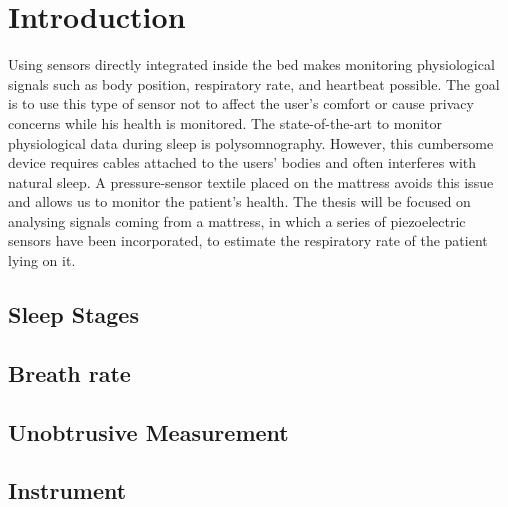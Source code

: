\chapter{Introduction}
Using sensors directly integrated inside the bed makes monitoring physiological signals such as body position, respiratory rate, and heartbeat possible. The goal is to use this type of sensor not to affect the user’s comfort or cause privacy concerns while his health is monitored. The state-of-the-art to monitor physiological data during sleep is polysomnography. 
However, this cumbersome device requires cables attached to the users' bodies and often interferes with natural sleep. A pressure-sensor textile placed on the mattress avoids this issue and allows us to monitor the patient's health. 
The thesis will be focused on analysing signals coming from a mattress, in which a series of piezoelectric sensors have been incorporated, to estimate the respiratory rate of the patient lying on it.


\section{Sleep Stages}
\section{Breath rate}
\section{Unobtrusive Measurement}
\section{Instrument}
